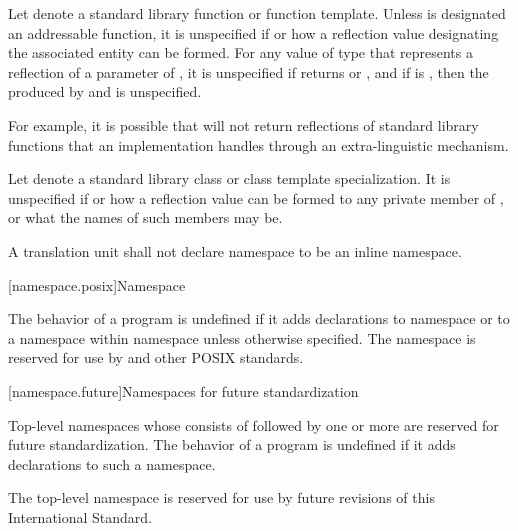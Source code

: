 \pnum
Let  denote
a standard library function or function template.
Unless  is designated an addressable function,
it is unspecified if or how
a reflection value designating the associated entity can be formed.
For any value  of type  that
represents a reflection of a parameter of ,
it is unspecified if 
returns  or , and
if  is , then
the \ntmbs{} produced by
 and
 is unspecified.
\begin{note}
For example, it is possible that 
will not return reflections of standard library functions
that an implementation handles through an extra-linguistic mechanism.
\end{note}

\pnum
Let  denote
a standard library class or class template specialization.
It is unspecified if or how
a reflection value can be formed to any private member of ,
or what the names of such members may be.

\pnum
A translation unit shall not declare namespace  to be an inline namespace.

[namespace.posix]{Namespace }

\pnum
The behavior of a \Cpp{} program is undefined if it adds declarations to namespace
or to a namespace within namespace
unless otherwise specified. The namespace  is reserved for use by
\IsoPosixUndated{} and other POSIX standards.

[namespace.future]{Namespaces for future standardization}

\pnum
Top-level namespaces whose  consists of 
followed by one or more 
are reserved for future standardization.
The behavior of a \Cpp{} program is undefined if
it adds declarations to such a namespace.
\begin{example}
The top-level namespace  is reserved
for use by future revisions of this International Standard.
\end{example}

